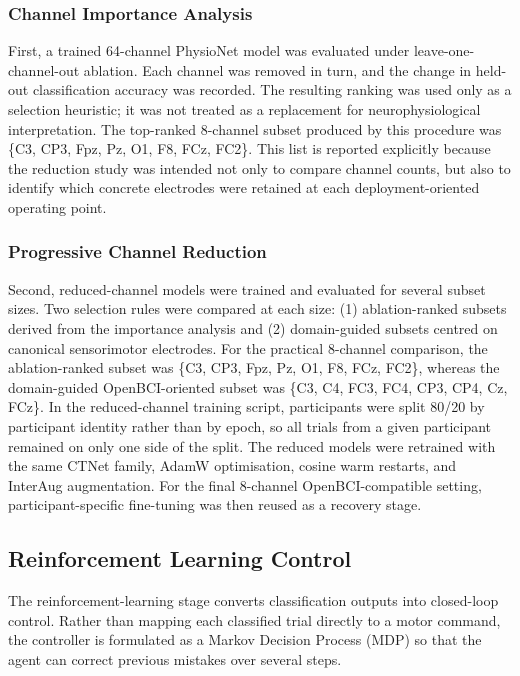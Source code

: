 \documentclass[12pt, a4paper]{article}
\begin{document}
\subsubsection{Channel Importance Analysis}

First, a trained 64-channel PhysioNet model was evaluated under leave-one-channel-out ablation. Each channel was removed in turn, and the change in held-out classification accuracy was recorded. The resulting ranking was used only as a selection heuristic; it was not treated as a replacement for neurophysiological interpretation. The top-ranked 8-channel subset produced by this procedure was \{C3, CP3, Fpz, Pz, O1, F8, FCz, FC2\}. This list is reported explicitly because the reduction study was intended not only to compare channel counts, but also to identify which concrete electrodes were retained at each deployment-oriented operating point.

\subsubsection{Progressive Channel Reduction}

Second, reduced-channel models were trained and evaluated for several subset sizes. Two selection rules were compared at each size: (1) ablation-ranked subsets derived from the importance analysis and (2) domain-guided subsets centred on canonical sensorimotor electrodes. For the practical 8-channel comparison, the ablation-ranked subset was \{C3, CP3, Fpz, Pz, O1, F8, FCz, FC2\}, whereas the domain-guided OpenBCI-oriented subset was \{C3, C4, FC3, FC4, CP3, CP4, Cz, FCz\}. In the reduced-channel training script, participants were split 80/20 by participant identity rather than by epoch, so all trials from a given participant remained on only one side of the split. The reduced models were retrained with the same CTNet family, AdamW optimisation, cosine warm restarts, and InterAug augmentation. For the final 8-channel OpenBCI-compatible setting, participant-specific fine-tuning was then reused as a recovery stage.

\subsection{Reinforcement Learning Control}

The reinforcement-learning stage converts classification outputs into closed-loop control. Rather than mapping each classified trial directly to a motor command, the controller is formulated as a Markov Decision Process (MDP) so that the agent can correct previous mistakes over several steps.
\end{document}
